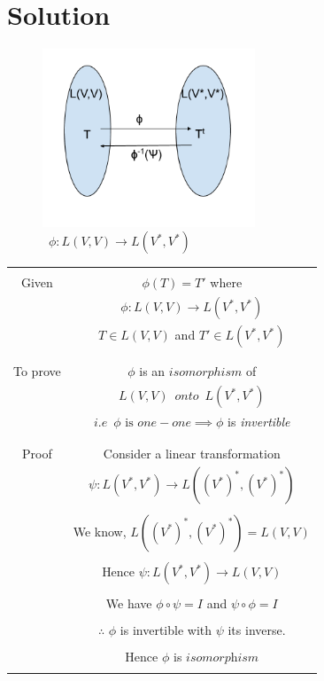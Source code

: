 \documentclass[journal,12pt,twocolumn]{IEEEtran}
\begin{document}
\section{Solution}
\begin{figure}[H]
\centering
\includegraphics[width=2.5in]{fig/transpose.png}
\caption{$\enspace \phi : L(V,V) \rightarrow L(V^*,V^*)$}
\end{figure}
\begin{table}[h]
\begin{center}
\begin{tabular}{|c|c|}
\hline
& \\
Given & $\phi(T) = T'$ where\\
& $\phi : L(V,V) \rightarrow L(V^*,V^*)$\\
& $T \in L(V,V)$ and $T' \in L(V^*,V^*)$\\
& \\
\hline
& \\
To prove & $\phi$ is an $isomorphism$ of\\
& $L(V,V) \enspace onto \enspace L(V^*,V^*)$\\
& $i.e \enspace \phi \text{ is } one-one \implies \phi$ is \textit{invertible}\\
& \\ 
\hline
& \\
Proof & Consider a linear transformation\\
& $\psi : L(V^*,V^*) \rightarrow L((V^*)^*,(V^*)^*)$\\
& \\
& We know, $L((V^*)^*,(V^*)^*) = L(V,V)$\\
& \\
& Hence $\psi : L(V^*,V^*) \rightarrow L(V,V)$\\
& \\
& We have $\phi \circ \psi = I$ and $\psi \circ \phi = I$\\
& \\
& $\therefore$ $\phi$ is invertible with $\psi$ its inverse.\\
& \\
& Hence $\phi$ is $\textit{isomorphism}$\\
& \\
\hline
\end{tabular}
\end{center}
\end{table}
\end{document}

